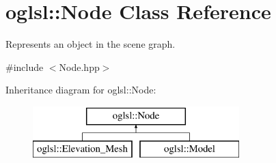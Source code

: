 \hypertarget{classoglsl_1_1_node}{}\section{oglsl\+:\+:Node Class Reference}
\label{classoglsl_1_1_node}


Represents an object in the scene graph.  




{\ttfamily \#include $<$Node.\+hpp$>$}

Inheritance diagram for oglsl\+:\+:Node\+:\begin{figure}[H]
\begin{center}
\leavevmode
\includegraphics[height=2.000000cm]{classoglsl_1_1_node}
\end{center}
\end{figure}
